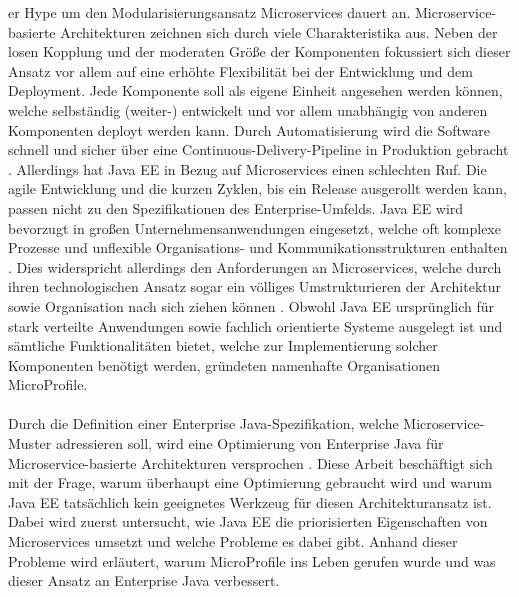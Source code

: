 er Hype um den Modularisierungsansatz Microservices dauert an. Microservice-basierte Architekturen zeichnen sich durch viele Charakteristika aus. Neben der losen Kopplung und der moderaten Größe der Komponenten fokussiert sich dieser Ansatz vor allem auf eine erhöhte Flexibilität bei der Entwicklung und dem Deployment. Jede Komponente soll als eigene Einheit angesehen werden können, welche selbständig (weiter-) entwickelt und vor allem unabhängig von anderen Komponenten deployt werden kann. Durch Automatisierung wird die Software schnell und sicher über eine Continuous-Delivery-Pipeline in Produktion gebracht \cite{EberhardWolff.2015}. Allerdings hat Java EE in Bezug auf Microservices einen schlechten Ruf. Die agile Entwicklung und die kurzen Zyklen, bis ein Release ausgerollt werden kann, passen nicht zu den Spezifikationen des Enterprise-Umfelds. Java EE wird bevorzugt in großen Unternehmensanwendungen eingesetzt, welche oft komplexe Prozesse und unflexible Organisations- und Kommunikationsstrukturen enthalten \cite{jaxcenter.2016}. Dies widerspricht allerdings den Anforderungen an Microservices, welche durch ihren technologischen Ansatz sogar ein völliges Umstrukturieren der Architektur sowie Organisation nach sich ziehen können \cite{EberhardWolff.2015}. Obwohl Java EE ursprünglich für stark verteilte Anwendungen sowie fachlich orientierte Systeme ausgelegt ist und sämtliche Funktionalitäten bietet, welche zur Implementierung solcher Komponenten benötigt werden, gründeten namenhafte Organisationen MicroProfile.\\ \\
Durch die Definition einer Enterprise Java-Spezifikation, welche Microservice-Muster adressieren soll, wird eine Optimierung von Enterprise Java für Microservice-basierte Architekturen versprochen \cite{Microprofile.2017}. Diese Arbeit beschäftigt sich mit der Frage, warum überhaupt eine Optimierung gebraucht wird und warum Java EE tatsächlich kein geeignetes Werkzeug für diesen Architekturansatz ist. Dabei wird zuerst untersucht, wie Java EE die priorisierten Eigenschaften von Microservices umsetzt und welche Probleme es dabei gibt. Anhand dieser Probleme wird erläutert, warum MicroProfile ins Leben gerufen wurde und was dieser Ansatz an Enterprise Java verbessert. \\ \\
